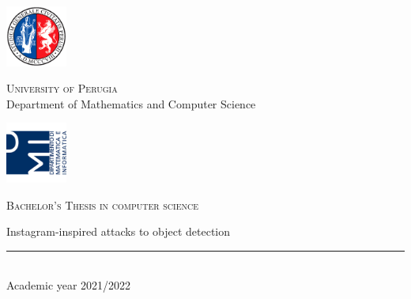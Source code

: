 
\thispagestyle{empty} %

	\noindent %
	\includegraphics[width=0.15\textwidth]{img/logoUniPg}
	\begin{minipage}[b]{0.7\textwidth}
		\centering
		{\Large \textcolor{blu_dmi}{\textsc{University of Perugia}}}\\
		\vspace{0.4 em}
		{\large \textcolor{blu_dmi}{Department of Mathematics and Computer Science}}
		\vspace{0.6 em}
	\end{minipage}%
	\includegraphics[width=0.15\textwidth]{img/logoDMI}
	
	\vspace{5 em}

	\begin{center}
		
		{\large \textcolor{blu_dmi}{\textsc{Bachelor's Thesis in computer science}}}
		\vspace{8 em}
		
		{\Huge \textcolor{blu_dmi}{Instagram-inspired attacks to object detection}}
		\vspace{10 em}
		
		
		
		\vspace{6 em}
		\vfill
		
		\textcolor{blu_dmi}{\rule{380pt}{.4pt}}\\
		\vspace{1.2 em}
		\large{\textcolor{blu_dmi}{Academic year 2021/2022}}
		
		 
		
		
	\end{center}

